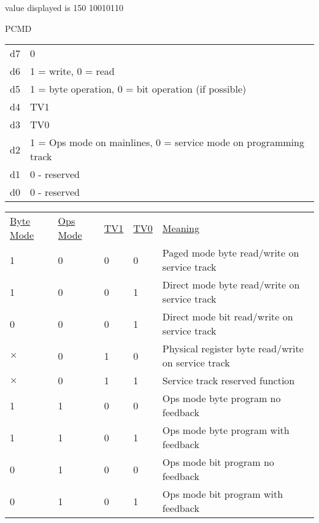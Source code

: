value displayed is 150 10010110

PCMD

\begin{tabular}{l l}
d7 & 0\\
d6 & 1 = write, 0 = read\\
d5 & 1 = byte operation, 0 = bit operation (if possible)\\
d4 & TV1\\
d3 & TV0\\
d2 & 1 = Ops mode on mainlines, 0 = service mode on programming track\\
d1 & 0 - reserved\\
d0 & 0 - reserved\\
\end{tabular}

\begin{tabular}{l l l l l}
\underline{Byte Mode} & \underline{Ops Mode} & \underline{TV1} & \underline{TV0} & \underline{Meaning} \\
1 & 0 & 0 & 0 & Paged mode byte read/write on service track\\
1 & 0 & 0 & 1 & Direct mode byte read/write on service track\\
0 & 0 & 0 & 1 & Direct mode bit read/write on service track\\
$\times$ & 0 & 1 & 0 & Physical register byte read/write on service track\\
$\times$ & 0 & 1 & 1 & Service track reserved function\\
1 & 1 & 0 & 0 & Ops mode byte program no feedback\\
1 & 1 & 0 & 1 & Ops mode byte program with feedback\\
0 & 1 & 0 & 0 & Ops mode bit program no feedback\\
0 & 1 & 0 & 1 & Ops mode bit program with feedback\\
\end{tabular}

